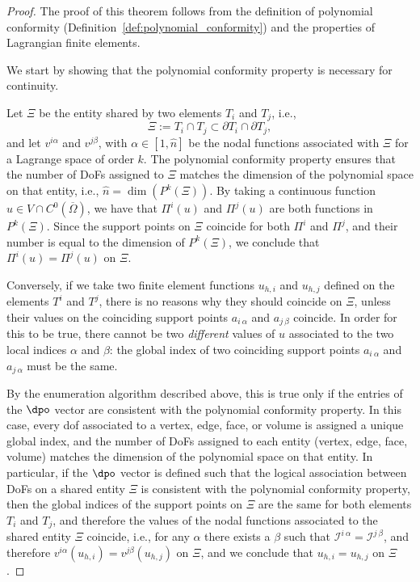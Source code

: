 \begin{proof}
  The proof of this theorem follows from the definition of polynomial conformity (Definition~\ref{def:polynomial_conformity}) and the properties of Lagrangian finite elements. 
  
  We start by showing that the polynomial conformity property is necessary for continuity.
  
  Let $\Xi$ be the entity shared by two elements $T_i$ and $T_j$, i.e., 
  \[
  \Xi := T_i \cap T_j \subset \partial T_i \cap \partial T_j,
  \]
  and let $v^{i\alpha}$ and $v^{j\beta}$, with $\alpha \in [1,\hat{n}]$ be the nodal functions associated with  $\Xi$ for a Lagrange space of order $k$. The polynomial conformity property ensures that the number of DoFs assigned to $\Xi$ matches the dimension of the polynomial space on that entity, i.e., $ \hat{n} = \dim(P^k(\Xi))$. By taking a continuous function $u\in V\cap C^0(\overline{\Omega})$, we have that $\Pi^i(u)$ and  $\Pi^j(u)$ are both functions in $P^k(\Xi)$. Since the support points on $\Xi$ coincide for both $\Pi^i$ and $\Pi^j$, and their number is equal to the dimension of $P^k(\Xi)$, we conclude that  $\Pi^i(u) = \Pi^j(u)$ on $\Xi$. 
  
  Conversely, if we take two finite element functions $u_{h,i}$ and $u_{h,j}$ defined on the elements $T^i$ and $T^j$, there is no reasons why they should coincide on $\Xi$, unless their values on the coinciding support points $a_{i~\alpha}$ and $a_{j~\beta}$ coincide. In order for this to be true, there cannot be two \emph{different} values of $u$ associated to the two local indices $\alpha$ and $\beta$: the global index of two coinciding support points $a_{i~\alpha}$ and $a_{j~\alpha}$ must be the same.
  
  By the enumeration algorithm described above, this is true only if the entries of the $\dpo$ vector are consistent with the polynomial conformity property. In this case, every dof associated to a vertex, edge, face, or volume is assigned a unique global index, and the number of DoFs assigned to each entity (vertex, edge, face, volume) matches the dimension of the polynomial space on that entity. In particular, if the $\dpo$ vector is defined such that the logical association between DoFs on a shared entity $\Xi$ is consistent with the polynomial conformity property, then the global indices of the support points on $\Xi$ are the same for both elements $T_i$ and $T_j$, and therefore the values of the nodal functions associated to the shared entity $\Xi$ coincide, i.e., for any $\alpha$ there exists a $\beta$ such that $\mathcal{I}^{i~\alpha} = \mathcal{I}^{j~\beta}$, and therefore $v^{i\alpha}(u_{h,i}) = v^{j\beta}(u_{h,j})$ on $\Xi$, and we conclude that $u_{h,i} = u_{h,j}$ on $\Xi$.
\end{proof}

